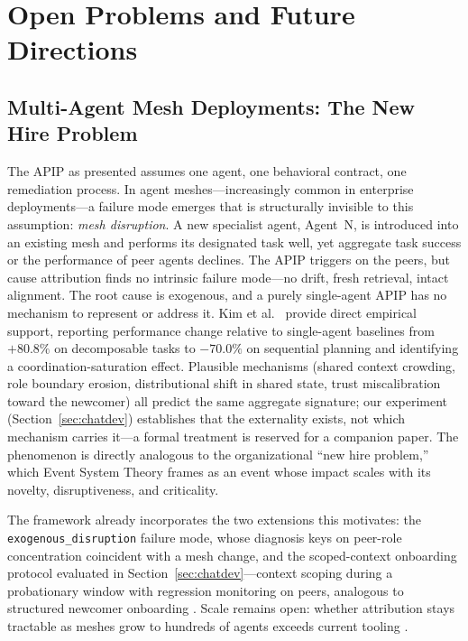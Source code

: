 \documentclass[conference]{IEEEtran}
\newcommand{\code}[1]{\texttt{\small #1}}
\begin{document}
\section{Open Problems and Future Directions}

\subsection{Multi-Agent Mesh Deployments: The New Hire Problem}
\label{sec:mesh}

The APIP as presented assumes one agent, one behavioral contract, one
remediation process. In agent meshes---increasingly common in enterprise
deployments---a failure mode emerges that is structurally invisible to this
assumption: \emph{mesh disruption}. A new specialist agent, Agent~N, is
introduced into an existing mesh and performs its designated task well, yet
aggregate task success or the performance of peer agents declines. The APIP
triggers on the peers, but cause attribution finds no intrinsic failure
mode---no drift, fresh retrieval, intact alignment. The root cause is
exogenous, and a purely single-agent APIP has no mechanism to represent or
address it. Kim et al.\
\cite{kim2025} provide direct empirical support, reporting performance change
relative to single-agent baselines from $+80.8\%$ on decomposable tasks to
$-70.0\%$ on sequential planning and identifying a coordination-saturation
effect. Plausible mechanisms (shared context crowding, role boundary erosion,
distributional shift in shared state, trust miscalibration toward the newcomer)
all predict the same aggregate signature; our experiment
(Section~\ref{sec:chatdev}) establishes that the externality exists, not which
mechanism carries it---a formal treatment is reserved for a companion paper. The phenomenon is directly analogous to the organizational
``new hire problem,'' which Event System Theory \cite{morgeson2015} frames as
an event whose impact scales with its novelty, disruptiveness, and criticality.

The framework already incorporates the two extensions this motivates: the
\code{exogenous\_disruption} failure mode, whose diagnosis keys on peer-role
concentration coincident with a mesh change, and the scoped-context onboarding
protocol evaluated in Section~\ref{sec:chatdev}---context scoping during a
probationary window with regression monitoring on peers, analogous to
structured newcomer onboarding \cite{kammeyer2013}. Scale remains open: whether
attribution stays tractable as meshes grow to hundreds of agents exceeds
current tooling \cite{krishnan2025}.
\end{document}

